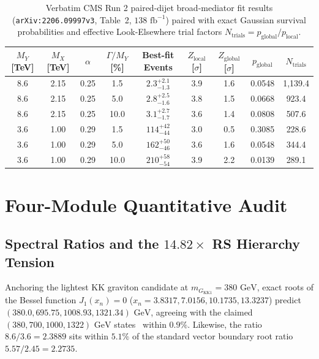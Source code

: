 \documentclass[11pt,a4paper]{article}
\begin{document}
\begin{table}[t]
\centering
\small
\setlength{\tabcolsep}{5pt}
\caption{Verbatim CMS Run 2 paired-dijet broad-mediator fit results (\texttt{arXiv:2206.09997v3}, Table~2, $138\text{ fb}^{-1}$) paired with exact Gaussian survival probabilities and effective Look-Elsewhere trial factors $N_{\mathrm{trials}} = p_{\mathrm{global}}/p_{\mathrm{local}}$.}
\label{tab:cms_table2}
\begin{tabular}{ccccccccc}
\toprule
$M_Y$ [TeV] & $M_X$ [TeV] & $\alpha$ & $\Gamma/M_Y$ [\%] & Best-fit Events & $Z_{\mathrm{local}}$ [$\sigma$] & $Z_{\mathrm{global}}$ [$\sigma$] & $p_{\mathrm{global}}$ & $N_{\mathrm{trials}}$ \\
\midrule
8.6 & 2.15 & 0.25 & 1.5  & $2.3^{+2.1}_{-1.3}$ & 3.9 & 1.6 & 0.0548 & 1,139.4 \\
8.6 & 2.15 & 0.25 & 5.0  & $2.8^{+2.5}_{-1.6}$ & 3.8 & 1.5 & 0.0668 & 923.4   \\
8.6 & 2.15 & 0.25 & 10.0 & $3.1^{+2.7}_{-1.7}$ & 3.6 & 1.4 & 0.0808 & 507.6   \\
\midrule
3.6 & 1.00 & 0.29 & 1.5  & $114^{+42}_{-44}$   & 3.0 & 0.5 & 0.3085 & 228.6   \\
3.6 & 1.00 & 0.29 & 5.0  & $162^{+50}_{-46}$   & 3.6 & 1.6 & 0.0548 & 344.4   \\
3.6 & 1.00 & 0.29 & 10.0 & $210^{+58}_{-54}$   & 3.9 & 2.2 & 0.0139 & 289.1   \\
\bottomrule
\end{tabular}
\end{table}

\section{Four-Module Quantitative Audit}

\subsection{Spectral Ratios and the \texorpdfstring{$14.82\times$}{14.82x} RS Hierarchy Tension}
Anchoring the lightest KK graviton candidate at $m_{G_{\mathrm{KK}1}} = 380\text{ GeV}$, exact roots of the Bessel function $J_1(x_n) = 0$ ($x_n = 3.8317, 7.0156, 10.1735, 13.3237$) predict $(380.0, 695.75, 1008.93, 1321.34)\text{ GeV}$, agreeing with the claimed $(380, 700, 1000, 1322)\text{ GeV}$ states~\cite{leyaouanc2026graviton} within $0.9\%$. Likewise, the ratio $8.6/3.6 = 2.3889$ sits within $5.1\%$ of the standard vector boundary root ratio $5.57/2.45 = 2.2735$.
\end{document}
